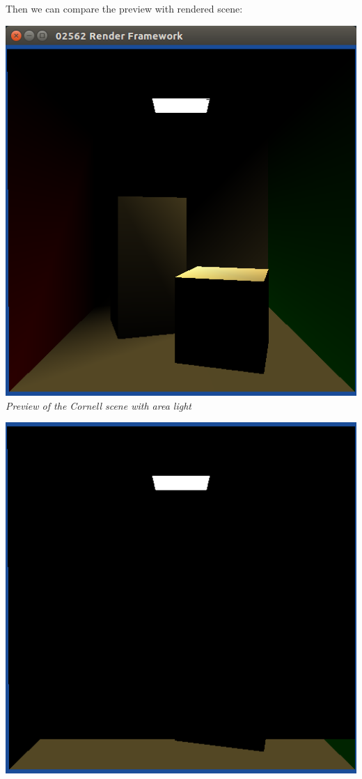 \documentclass[a4,12pt]{article}
\begin{document}
	
	Then we can compare the preview with rendered scene:
	\begin{center}
		\begin{minipage}[b]{0.40\linewidth}
			\begin{center}
				\includegraphics[width = \textwidth]{./Worksheet4/preview_cornell_area.png}\\
				\textit{Preview of the Cornell scene with area light}
			\end{center}
		\end{minipage}
		\hspace{0.05\linewidth}
		\begin{minipage}[b]{0.40\linewidth}
			\begin{center}
				\includegraphics[width =\textwidth]{./Worksheet4/cornellblocks.png}\\

\end{center}
\end{minipage}
\end{center}
\end{document}
